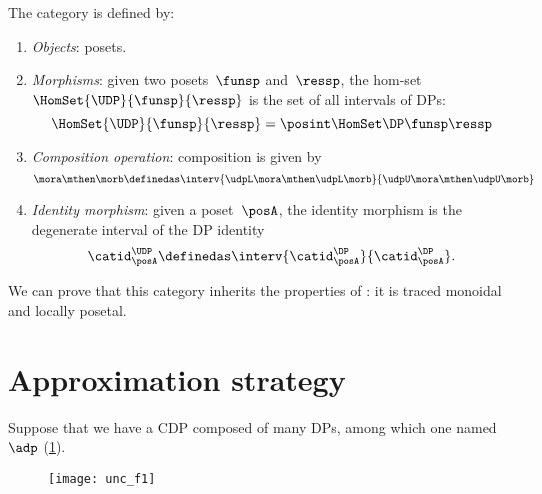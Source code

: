 \begin{ctdefinition}
    \label{def:UDP}
    The category \UDP is defined by:
    \begin{enumerate}
        \item \emph{Objects}: posets.
        \item \emph{Morphisms}: given two posets~$\funsp$ and~$\ressp$, the hom-set~$\HomSet{\UDP}{\funsp}{\ressp}$ is the set of all intervals of DPs:
              \begin{equation}
                  \HomSet{\UDP}{\funsp}{\ressp}=\posint \HomSet\DP\funsp\ressp
              \end{equation}
        \item \emph{Composition operation}: composition is given by
              \begin{equation}
                  \mora \mthen \morb \definedas \interv{ \udpL\mora\mthen \udpL\morb}{\udpU\mora\mthen \udpU\morb}
              \end{equation}
        \item \emph{Identity morphism}: given a poset~$\posA$, the identity morphism is the degenerate interval of the DP identity
              \begin{equation}
                  \catid^{\UDP}_{\posA} \definedas \interv{\catid^{\DP}_\posA}{\catid^{\DP}_\posA}.
              \end{equation}
    \end{enumerate}
\end{ctdefinition}

We can prove that this category inherits the properties of \DP: it is traced monoidal and locally posetal.


\section{Approximation strategy}
\label{sec:Approximation-results}


Suppose that we have a CDP composed of many DPs, among which one named~$\adp$ (\cref{fig:consider1}).

\begin{figure}[h!]
    \texttt{[image: unc\_f1]}
    \caption{}
    \label{fig:consider1}
\end{figure}

